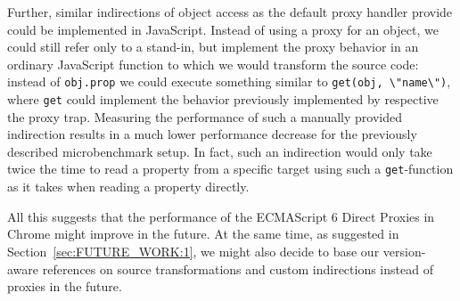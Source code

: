  





Further, similar indirections of object access as the default proxy handler provide could be implemented in JavaScript.
Instead of using a proxy for an object, we could still refer only to a stand-in, but implement the proxy behavior in an ordinary JavaScript function to which we would transform the source code: instead of \lstinline{obj.prop} we could execute something similar to \lstinline{get(obj, \"name\")}, where \lstinline{get} could implement the behavior previously implemented by respective the proxy trap.
Measuring the performance of such a manually provided indirection results in a much lower performance decrease for the previously described microbenchmark setup.
In fact, such an indirection would only take twice the time to read a property from a specific target using such a \lstinline{get}-function as it takes when reading a property directly. 


All this suggests that the performance of the ECMAScript 6 Direct Proxies in Chrome might improve in the future.
At the same time, as suggested in Section~\ref{sec:FUTURE_WORK:1}, we might also decide to base our version-aware references on source transformations and custom indirections instead of proxies in the future.


